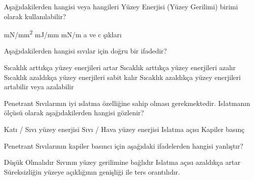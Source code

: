 \begin{question}[subtitle=]
Aşağıdakilerden hangisi veya hangileri Yüzey Enerjisi (Yüzey Gerilimi) birimi olarak kullanılabilir?
	\begin{tasks}
          \task \si[per-mode=symbol]{\mN\per\mm^{2}}
          \task mJ/mm 
          \task mN/m \correct
          \task a ve c şıkları 
	\end{tasks}
\end{question}
\begin{solution}
	\correct
\end{solution}

\begin{question}[subtitle=]
Aşağıdakilerden hangisi sıvılar için doğru bir ifadedir?
	\begin{tasks}
          \task Sıcaklık arttıkça yüzey enerjileri artar
          \task Sıcaklık arttıkça yüzey enerjileri azalır \correct
          \task Sıcaklık azaldıkça yüzey enerjileri sabit kalır
          \task Sıcaklık azaldıkça yüzey enerjileri artabilir veya azalabilir
	\end{tasks}
\end{question}
\begin{solution}
	\correct
\end{solution}

\begin{question}[subtitle=]
Penetrant Sıvılarının iyi ıslatma özelliğine sahip olması gerekmektedir. Islatmanın ölçüsü olarak aşağıdakilerden hangisi gözlenir?
	\begin{tasks}
          \task Katı / Sıvı yüzey enerjisi
          \task Sıvı / Hava yüzey enerjisi
          \task Islatma açısı \correct
          \task Kapiler basınç
	\end{tasks}
\end{question}
\begin{solution}
	\correct
\end{solution}

\begin{question}[subtitle=]
Penetrant Sıvılarının kapiler basıncı için aşağıdaki ifadelerden hangisi yanlıştır?
	\begin{tasks}
          \task Düşük Olmalıdır \correct
          \task Sıvının yüzey gerilimine bağlıdır
          \task Islatma açısı azaldıkça artar
          \task Süreksizliğin yüzeye açıklığının genişliği ile ters orantılıdır.
	\end{tasks}
\end{question}
\begin{solution}
	\correct
\end{solution}

